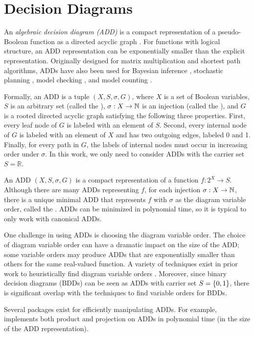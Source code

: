 \section{Decision Diagrams}
\label{sec:background:dd}
An \emph{algebraic decision diagram (ADD)} is a compact representation of a pseudo-Boolean function as a directed acyclic graph \cite{bahar1997algebraic}.
For functions with logical structure, an ADD representation can be exponentially smaller than the explicit representation.
Originally designed for matrix multiplication and shortest path algorithms, ADDs have also been used for Bayesian inference \cite{chavira2007compiling,gogate2011approximation}, stochastic planning \cite{hoey1999spudd}, model checking \cite{kwiatkowska2007stochastic}, and model counting \cite{fargier2014knowledge,DPV20}.

Formally, an ADD is a tuple $(X, S, \sigma, G)$, where $X$ is a set of Boolean variables, $S$ is an arbitrary set (called the ), $\sigma: X \to \mathbb{N}$ is an injection (called the ), and $G$ is a rooted directed acyclic graph satisfying the following three properties.
First, every leaf node of $G$ is labeled with an element of $S$.
Second, every internal node of $G$ is labeled with an element of $X$ and has two outgoing edges, labeled 0 and 1.
Finally, for every path in $G$, the labels of internal nodes must occur in increasing order under $\sigma$.
In this work, we only need to consider ADDs with the carrier set $S = \mathbb{R}$.

An ADD $(X, S, \sigma, G)$ is a compact representation of a function $f: 2^X \to S$.
Although there are many ADDs representing $f$, for each injection $\sigma: X \to \mathbb{N}$, there is a unique minimal ADD that represents $f$ with $\sigma$ as the diagram variable order, called the .
ADDs can be minimized in polynomial time, so it is typical to only work with canonical ADDs.

One challenge in using ADDs is choosing the diagram variable order.
The choice of diagram variable order can have a dramatic impact on the size of the ADD; some variable orders may produce ADDs that are exponentially smaller than others for the same real-valued function.
A variety of techniques exist in prior work to heuristically find diagram variable orders \cite{tarjan1984simple,koster2001treewidth,dechter03}.
Moreover, since binary decision diagrams (BDDs) \cite{bryant1986graph} can be seen as ADDs with carrier set $S = \left\{ 0, 1 \right\}$, there is significant overlap with the techniques to find variable orders for BDDs.

Several packages exist for efficiently manipulating ADDs.
For example, \cudd{} \cite{somenzi2015cudd} implements both product and projection on ADDs in polynomial time (in the size of the ADD representation).